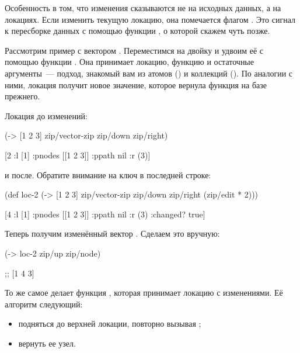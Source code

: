 Особенность в том, что изменения сказываются не на исходных данных, а на
локациях. Если изменить текущую локацию, она помечается флагом . Это
сигнал к пересборке данных с помощью функции , о которой скажем чуть
позже.

Рассмотрим пример с вектором \code{[1 2 3]}. Переместимся на двойку и удвоим её с
помощью функции . Она принимает локацию, функцию и остаточные
аргументы~--- подход, знакомый вам из атомов () и коллекций (). По
аналогии с ними, локация получит новое значение, которое вернула функция на базе
прежнего.

Локация до изменений:

\begin{english}
  \begin{clojure}
(-> [1 2 3]
    zip/vector-zip
    zip/down
    zip/right)

[2 {:l [1] :pnodes [[1 2 3]] :ppath nil :r (3)}]
  \end{clojure}
\end{english}

\noindent
и после. Обратите внимание на ключ  в последней строке:

\begin{english}
  \begin{clojure}
(def loc-2
  (-> [1 2 3]
      zip/vector-zip
      zip/down
      zip/right
      (zip/edit * 2)))

[4 {:l [1] :pnodes [[1 2 3]] :ppath nil :r (3)
    :changed? true}]
  \end{clojure}
\end{english}

Теперь получим изменённый вектор \code{[1 4 3]}. Сделаем это вручную:

\begin{english}
  \begin{clojure}
(-> loc-2
    zip/up
    zip/node)

;; [1 4 3]
  \end{clojure}
\end{english}

То же самое делает функция , которая принимает локацию с
изменениями. Её алгоритм следующий:

\begin{itemize}

\item
  подняться до верхней локации, повторно вызывая ;

\item
  вернуть ее узел.

\end{itemize}

